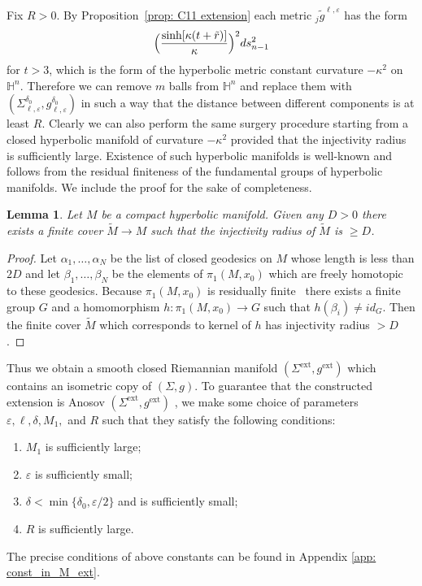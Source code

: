 \documentclass[10pt]{amsart}
\newcommand{\ext}{\mathrm{ext}}
\newtheorem{lemma}[theorem]{Lemma}
\theoremstyle{definition}
\let\eps\varepsilon
\renewcommand{\>}{{\rangle}}
\newcommand{\<}{{\langle}}
\begin{document}
Fix $R>0$. By Proposition~\ref{prop: C11 extension} each metric ${}_j\tilde g^{\ell,\eps}$ has the form
\[
\Bigl(\frac{\sinh[\kappa(t+\tilde r)]}{\kappa}\Bigr)^2ds^2_{n-1}
\]
for $t > 3$, which is the form of the hyperbolic metric constant curvature $-\kappa^2$ on $\mathbb H^n$. Therefore we can remove $m$ balls from $\mathbb H^n$ and replace them with $(\Sigma^{\delta_0}_{\ell,\eps}, g^{\delta_0}_{\ell,\eps})$ in such a way that the distance between different components is at least $R$. Clearly we can also perform the same surgery procedure starting from a closed hyperbolic manifold of curvature $-\kappa^2$ provided that the injectivity radius is sufficiently large.
Existence of such hyperbolic manifolds is well-known and follows from the residual finiteness of the fundamental groups of hyperbolic manifolds. We include the proof for the sake of completeness.
\begin{lemma}\label{lemma: large injectivity radius}
Let $M$ be a compact hyperbolic manifold. Given any $D>0$ there exists a finite cover $\tilde M\to M$ such that the injectivity radius of $\tilde M$ is $\ge D$.
\end{lemma}

\begin{proof}
Let $\alpha_1,\dots,\alpha_N$ be the list of closed geodesics on $M$ whose length is less than $2D$ and let $\beta_1,\dots,\beta_N$ be the elements of $\pi_1(M,x_0)$ which are freely homotopic to these geodesics. Because $\pi_1(M,x_0)$ is residually finite~\cite{Mal} there exists a finite group $G$ and a homomorphism $h\colon \pi_1(M,x_0)\to G$ such that $h(\beta_i)\neq id_G$. Then the finite cover $\tilde M$ which corresponds to kernel of $h$ has injectivity radius $>D$.
\end{proof}

Thus we obtain
a smooth closed Riemannian manifold $(\Sigma^{\ext}, g^{\ext})$ which contains an isometric copy of $(\Sigma,g)$. To guarantee that the constructed extension is Anosov $(\Sigma^{\ext}, g^{\ext})$ , we make some choice of parameters $\eps, \ell, \delta, M_1,$ and $R$ such that they satisfy the following conditions:
\begin{enumerate}\renewcommand{\theenumi}{C\arabic{enumi}}
\item $M_1$ is sufficiently large;
\item \label{cond: eps} $\eps$ is sufficiently small;
\item\label{cond: delta} $\delta<\min\{\delta_0, \eps/2\}$ and is sufficiently small;
\item $R$ is sufficiently large.
\end{enumerate}
The precise conditions of above constants can be found in Appendix \ref{app: const_in_M_ext}.
\end{document}
